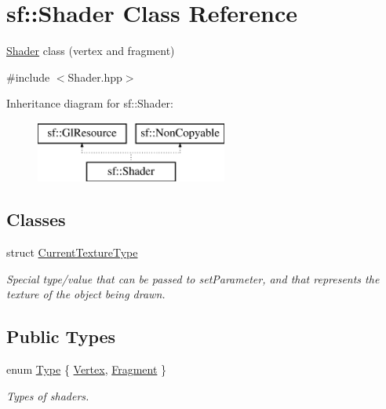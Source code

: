 \hypertarget{classsf_1_1Shader}{\section{sf\-:\-:Shader Class Reference}
\label{classsf_1_1Shader}
}


\hyperlink{classsf_1_1Shader}{Shader} class (vertex and fragment)  




{\ttfamily \#include $<$Shader.\-hpp$>$}

Inheritance diagram for sf\-:\-:Shader\-:\begin{figure}[H]
\begin{center}
\leavevmode
\includegraphics[height=2.000000cm]{classsf_1_1Shader}
\end{center}
\end{figure}
\subsection*{Classes}
\begin{DoxyCompactItemize}
\item 
struct \hyperlink{structsf_1_1Shader_1_1CurrentTextureType}{Current\-Texture\-Type}
\begin{DoxyCompactList}\small\item\em Special type/value that can be passed to set\-Parameter, and that represents the texture of the object being drawn. \end{DoxyCompactList}\end{DoxyCompactItemize}
\subsection*{Public Types}
\begin{DoxyCompactItemize}
\item 
enum \hyperlink{classsf_1_1Shader_afaa1aa65e5de37b74d047da9def9f9b3}{Type} \{ \hyperlink{classsf_1_1Shader_afaa1aa65e5de37b74d047da9def9f9b3a8718008f827eb32e29bbdd1791c62dce}{Vertex}, 
\hyperlink{classsf_1_1Shader_afaa1aa65e5de37b74d047da9def9f9b3ace6e88eec3a56b2e55ee3c8e64e9b89a}{Fragment}
 \}
\begin{DoxyCompactList}\small\item\em Types of shaders. \end{DoxyCompactList}\end{DoxyCompactItemize}
